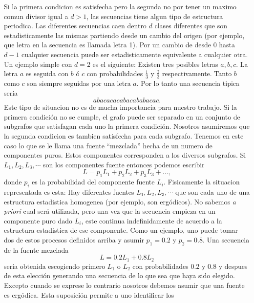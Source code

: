 Si la primera condicion es satisfecha pero la segunda no por tener un
maximo comun divisor igual a $d > 1$, las secuencias tiene algun tipo
de estructura periodica. Las diferentes secuencias caen dentro $d$
clases diferentes que son estadisticamente las mismas partiendo desde
un cambio del origen (por ejemplo, que letra en la secuencia es
llamada letra 1). Por un cambio de desde $0$ hasta $d - 1$ cualquier
secuencia puede ser estadisticamente equivalente a cualquier otra. Un
ejemplo simple con $d = 2$ es el siguiente: Existen tres posibles
letras $a, b , c$.  La letra $a$ es seguida con $b$ \'{o} $c$ con
probabilidades $\frac{1}{3}$ y $\frac{2}{3}$ respectivamente.  Tanto
$b$ como $c$ son siempre seguidas por una letra $a$. Por lo tanto una
secuencia tipica ser\'{i}a
$$a b a c a c a c a b a c a b a b a c a c.$$
Este tipo de situacion no es de mucha importancia para nuestro
trabajo.  Si la primera condici\'{o}n no se cumple, el grafo puede ser
separado en un conjunto de subgrafos que satisfagan cada uno la
primera condici\'{o}n.  Nosotros asumiremos que la segunda condicion
es tambien satisfecha para cada subgrafo.  Tenemos en este caso lo que
se le llama una fuente ``mezclada'' hecha de un numero de componentes
puros. Estos componentes corresponden a los diversos subgrafos. Si
$L_{1}, L_{2}, L_{3}, \cdots$ son los componentes fuente entonces
podemos escribir
\begin{equation}
L = p_{1}L_{1} + p_{2}L_{2} + p_{3}L_{3} + \ldots,
\end{equation}
donde $p_{i}$ es la probabilidad del componente fuente $L_{i}$.
Fisicamente la situacion representada es esta: Hay diferentes fuentes
$L_{1}, L_{2}, L_{3}, \cdots$ que son cada uno de una estructura
estadistica homogenea (por ejemplo, son erg\'{o}dicos). No sabemos
\textit{a priori} cual ser\'{a} utilizada, pero una vez que la
secuencia empieza en un componente puro dado $L_{i}$, este continua
indefinidamente de acuerdo a la estructura estadistica de ese
componente.  Como un ejemplo, uno puede tomar dos de estos procesos
definidos arriba y asumir $p_{1} = 0.2$ y $p_{2} = 0.8$. Una secuencia
de la fuente mezclada
\begin{equation}
L = 0.2 L_{1} + 0.8 L_{2}
\end{equation}
ser\'{i}a obtenida escogiendo primero $L_{1}$ o $L_{2}$ con
probabilidades $0.2$ y $0.8$ y despues de esta elecci\'{o}n generando
una secuencia de lo que sea que haya sido elegido.  Excepto cuando se
exprese lo contrario nosotros debemos asumir que una fuente es
erg\'{o}dica. Esta suposici\'{o}n permite a uno identificar los
